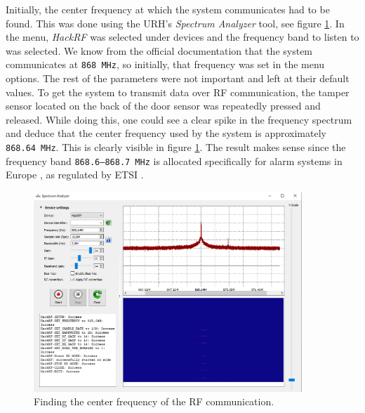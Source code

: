 Initially, the center frequency at which the system communicates had to be found. This was done using the URH's \textit{Spectrum Analyzer} tool, see figure \ref{fig:finding-center-freq}. In the menu, \textit{HackRF} was selected under devices and the frequency band to listen to was selected. We know from the official documentation that the system communicates at \texttt{868 MHz}, so initially, that frequency was set in the menu options. The rest of the parameters were not important and left at their default values. To get the system to transmit data over RF communication, the tamper sensor located on the back of the door sensor was repeatedly pressed and released. While doing this, one could see a clear spike in the frequency spectrum and deduce that the center frequency used by the system is approximately \texttt{868.64 MHz}. This is clearly visible in figure \ref{fig:finding-center-freq}. The result makes sense since the frequency band \texttt{868.6–868.7 MHz} is allocated specifically for alarm systems in Europe \cite{etsi-srd-regulation}, as regulated by ETSI .
\begin{figure}[!ht]
    \centering
    \includegraphics[width=0.9\textwidth]{images/6-pentesting/find-frequency.png}
    \caption{Finding the center frequency of the RF communication.}
    \label{fig:finding-center-freq}
\end{figure}

